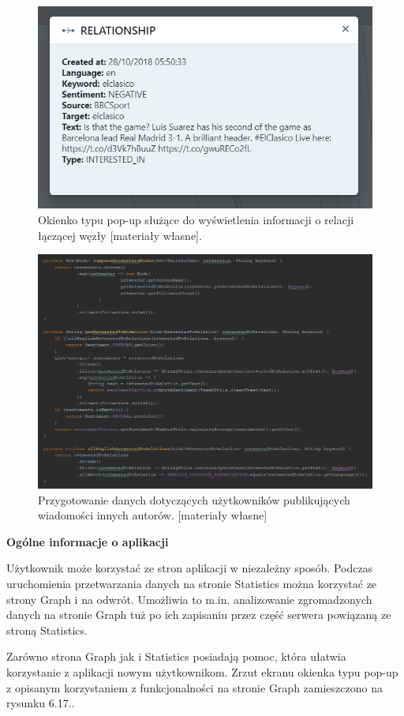 \begin{figure}[h] %
	\centering
	\includegraphics[width=0.6\linewidth]{img/twitter_analyser_relationship}
	\caption{Okienko typu pop-up służące do wyświetlenia informacji o relacji łączącej węzły [materiały własne].}
\end{figure}

\begin{figure}[h] %
	\centering
	\includegraphics[width=1.0\linewidth]{img/twitter_analyser_compute_retweeters_nodes}
	\caption{Przygotowanie danych dotyczących użytkowników publikujących wiadomości innych autorów. [materiały własne]}
\end{figure}

\textbf{Ogólne informacje o aplikacji}

Użytkownik może korzystać ze stron aplikacji w niezależny sposób. Podczas uruchomienia przetwarzania danych na stronie Statistics można korzystać ze strony Graph i na odwrót. Umożliwia to m.in. analizowanie zgromadzonych danych na stronie Graph tuż po ich zapisaniu przez część serwera powiązaną ze stroną Statistics.

Zarówno strona Graph jak i Statistics posiadają pomoc, która ułatwia korzystanie z aplikacji nowym użytkownikom. Zrzut ekranu okienka typu pop-up z opisanym korzystaniem z funkcjonalności na stronie Graph zamieszczono na rysunku 6.17..

